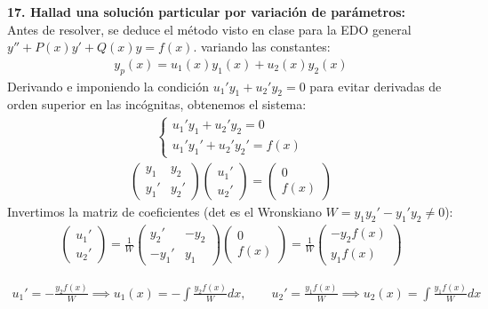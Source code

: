 \documentclass[11pt, a4paper]{article}
\begin{document}
\noindent\textbf{17. Hallad una solución particular por variación de parámetros:} \\
Antes de resolver, se deduce el método visto en clase para la EDO general $y'' + P(x)y' + Q(x)y = f(x)$. variando las constantes:
\begin{align*}
y_p(x) = u_1(x)y_1(x) + u_2(x)y_2(x)
\end{align*}
Derivando e imponiendo la condición $u_1'y_1 + u_2'y_2 = 0$ para evitar derivadas de orden superior en las incógnitas, obtenemos el sistema:
\begin{align*}
\begin{cases} u_1'y_1 + u_2'y_2 = 0 \\ u_1'y_1' + u_2'y_2' = f(x) \end{cases}
\end{align*}
\begin{align*}
\begin{pmatrix} y_1 & y_2 \\ y_1' & y_2' \end{pmatrix} \begin{pmatrix} u_1' \\ u_2' \end{pmatrix} = \begin{pmatrix} 0 \\ f(x) \end{pmatrix}
\end{align*}
Invertimos la matriz de coeficientes (det es el Wronskiano $W = y_1y_2' - y_1'y_2 \neq 0$):
\begin{align*}
\begin{pmatrix} u_1' \\ u_2' \end{pmatrix} = \frac{1}{W} \begin{pmatrix} y_2' & -y_2 \\ -y_1' & y_1 \end{pmatrix} \begin{pmatrix} 0 \\ f(x) \end{pmatrix} = \frac{1}{W} \begin{pmatrix} -y_2 f(x) \\ y_1 f(x) \end{pmatrix}
\end{align*}

\begin{align*}
u_1' = -\frac{y_2 f(x)}{W} \implies u_1(x) = -\int \frac{y_2 f(x)}{W} dx, \qquad u_2' = \frac{y_1 f(x)}{W} \implies u_2(x) = \int \frac{y_1 f(x)}{W} dx
\end{align*}
\end{document}
